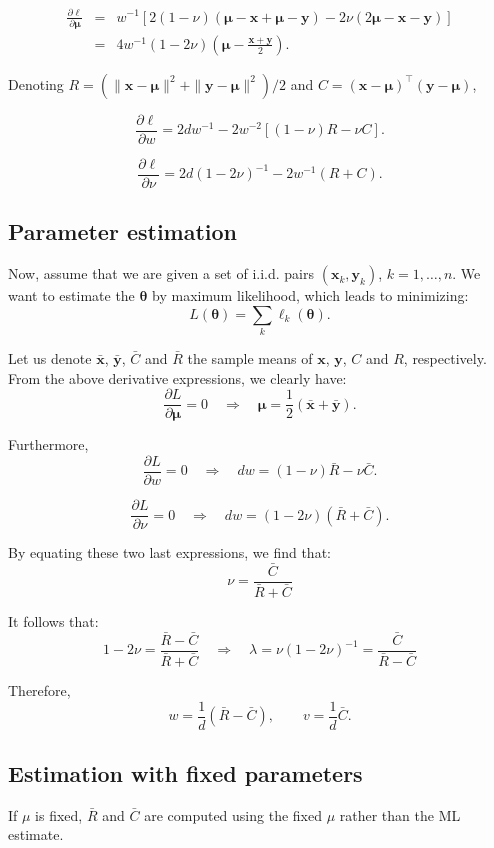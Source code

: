 \documentclass{article}
\def\x{{\mathbf{x}}}
\def\y{{\mathbf{y}}}
\def\m{{\boldsymbol{\mu}}}
\def\param{{\boldsymbol{\theta}}}
\begin{document}
\begin{eqnarray*}
\frac{\partial \ell}{\partial \m}
& = & 
w^{-1} \left[
2(1-\nu)(\m - \x + \m - \y) 
- 2\nu (2\m - \x - \y) \right] \\
& = & 
4 w^{-1} (1-2\nu) 
\left(\m - \frac{\x + \y}{2} \right)
.
\end{eqnarray*}

Denoting $R=(\|\x-\m\|^2+\|\y-\m\|^2)/2$ and $C=(\x-\m)^\top(\y-\m)$,

$$
\frac{\partial \ell}{\partial w}
=
2d w^{-1} - 2w^{-2}
[(1-\nu) R - \nu C]
.
$$

$$
\frac{\partial \ell}{\partial \nu}
=
2d (1-2\nu)^{-1} - 2w^{-1}(R + C)
.
$$


\subsection{Parameter estimation}

Now, assume that we are given a set of i.i.d. pairs $(\x_k,\y_k)$, $k=1,\ldots,n$. We want to estimate the $\param$ by maximum likelihood, which leads to minimizing:
$$
L(\param) 
= \sum_k \ell_k(\param)
.
$$

Let us denote $\bar{\x}$, $\bar{\y}$, $\bar{C}$ and $\bar{R}$ the sample means of $\x$, $\y$, $C$ and $R$, respectively. From the above derivative expressions, we clearly have:
$$
\frac{\partial L}{\partial \m} = 0 
\quad \Rightarrow \quad
\m = \frac{1}{2} (\bar{\x} + \bar{\y})
.
$$

Furthermore, 
$$
\frac{\partial L}{\partial w}=0
\quad \Rightarrow \quad
dw = (1-\nu)\bar{R} -\nu\bar{C}.
$$

$$
\frac{\partial L}{\partial \nu}=0
\quad \Rightarrow \quad
dw = (1-2\nu)(\bar{R}+\bar{C}).
$$

By equating these two last expressions, we find that:
$$
\nu = \frac{\bar{C}}{\bar{R}+\bar{C}}
$$

It follows that:
$$
1-2\nu = \frac{\bar{R}-\bar{C}}{\bar{R}+\bar{C}}
\quad
\Rightarrow
\quad
\lambda = \nu(1-2\nu)^{-1} = \frac{\bar{C}}{\bar{R}-\bar{C}}
$$

Therefore, 
$$
w = \frac{1}{d} (\bar{R} -\bar{C}),
\qquad
v = \frac{1}{d} \bar{C}
.
$$


\subsection{Estimation with fixed parameters}

If $\mu$ is fixed, $\bar{R}$ and $\bar{C}$ are computed using the fixed $\mu$ rather than the ML estimate. 
\end{document}
